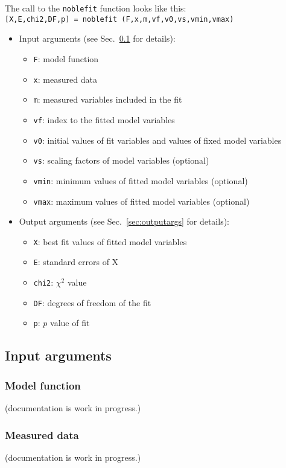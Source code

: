 \documentclass[12pt]{article}
\newcommand{\secref}[1]{Sec.~\ref{sec:#1}}
\begin{document}
The call to the {\tt noblefit} function looks like this:\\
{\tt [X,E,chi2,DF,p] = noblefit (F,x,m,vf,v0,vs,vmin,vmax)}
\begin{itemize}
\item Input arguments (see \secref{inputargs} for details):
\begin{itemize}
	\item {\tt F}: model function
	\item {\tt x}: measured data
	\item {\tt m}: measured variables included in the fit
	\item {\tt vf}: index to the fitted model variables
	\item {\tt v0}: initial values of fit variables and values of fixed model variables
	\item {\tt vs}: scaling factors of model variables (optional)
	\item {\tt vmin}: minimum values of fitted model variables (optional)
	\item {\tt vmax}: maximum values of fitted model variables (optional)
\end{itemize}
\item Output arguments (see \secref{outputargs} for details):
\begin{itemize}
	\item {\tt X}: best fit values of fitted model variables
	\item {\tt E}: standard errors of X
	\item {\tt chi2}: $\chi^2$ value
	\item {\tt DF}: degrees of freedom of the fit
	\item {\tt p}: $p$ value of fit
\end{itemize}
\end{itemize}
\par

\subsection{Input arguments}\label{sec:inputargs}
\subsubsection{Model function}
(documentation is work in progress.)

\subsubsection{Measured data}
(documentation is work in progress.)
\end{document}

